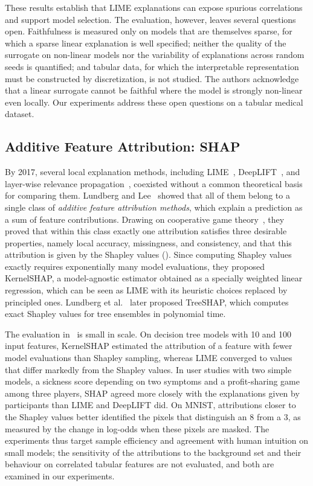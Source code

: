 These results establish that LIME explanations can expose spurious correlations and support model selection. The evaluation, however, leaves several questions open. Faithfulness is measured only on models that are themselves sparse, for which a sparse linear explanation is well specified; neither the quality of the surrogate on non-linear models nor the variability of explanations across random seeds is quantified; and tabular data, for which the interpretable representation must be constructed by discretization, is not studied. The authors acknowledge that a linear surrogate cannot be faithful where the model is strongly non-linear even locally. Our experiments address these open questions on a tabular medical dataset.

\subsection{Additive Feature Attribution: SHAP}
\label{sec:review-shap}

By 2017, several local explanation methods, including LIME~\cite{ribeiro-etal-2016-trust}, DeepLIFT~\cite{shrikumar2017deeplift}, and layer-wise relevance propagation~\cite{bach2015lrp}, coexisted without a common theoretical basis for comparing them. Lundberg and Lee~\cite{NIPS2017_8a20a862} showed that all of them belong to a single class of \textit{additive feature attribution methods}, which explain a prediction as a sum of feature contributions. Drawing on cooperative game theory~\cite{shapley1953value}, they proved that within this class exactly one attribution satisfies three desirable properties, namely local accuracy, missingness, and consistency, and that this attribution is given by the Shapley values (). Since computing Shapley values exactly requires exponentially many model evaluations, they proposed KernelSHAP, a model-agnostic estimator obtained as a specially weighted linear regression, which can be seen as LIME with its heuristic choices replaced by principled ones. Lundberg et al.~\cite{lundberg2018consistent} later proposed TreeSHAP, which computes exact Shapley values for tree ensembles in polynomial time.

The evaluation in~\cite{NIPS2017_8a20a862} is small in scale. On decision tree models with 10 and 100 input features, KernelSHAP estimated the attribution of a feature with fewer model evaluations than Shapley sampling, whereas LIME converged to values that differ markedly from the Shapley values. In user studies with two simple models, a sickness score depending on two symptoms and a profit-sharing game among three players, SHAP agreed more closely with the explanations given by participants than LIME and DeepLIFT did. On MNIST, attributions closer to the Shapley values better identified the pixels that distinguish an 8 from a 3, as measured by the change in log-odds when these pixels are masked. The experiments thus target sample efficiency and agreement with human intuition on small models; the sensitivity of the attributions to the background set and their behaviour on correlated tabular features are not evaluated, and both are examined in our experiments.
